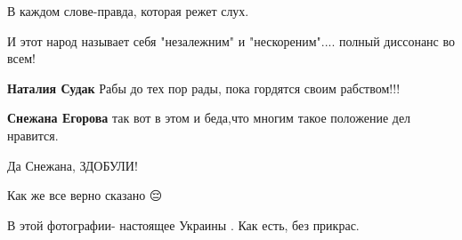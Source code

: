 \begin{itemize}
В каждом слове-правда, которая режет слух.

 
И этот народ называет себя "незалежним" и "нескореним".... полный диссонанс во всем!

\begin{itemize}
 
\textbf{Наталия Судак} Рабы до тех пор рады, пока гордятся своим рабством!!!

 
\textbf{Снежана Егорова} так вот в этом и беда,что многим такое положение дел нравится.
\end{itemize}

 
Да Снежана, ЗДОБУЛИ!

 
Как же все верно сказано 😔

 
В этой фотографии- настоящее Украины . Как есть, без прикрас.


\end{itemize}
